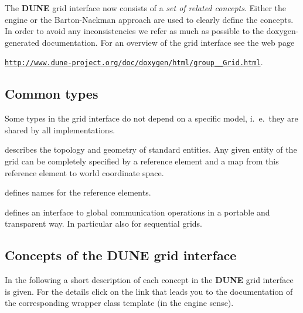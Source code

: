 \documentclass[11pt,a4paper,headinclude,footinclude,DIV16,normalheadings]{scrreprt}
\newcommand{\Dune}{{\sf\bfseries DUNE}}
\begin{document}
The \Dune{} grid interface now consists of a \textit{set of related concepts}.
Either the engine or the Barton-Nackman approach are used to clearly
define the concepts. In order to avoid any inconsistencies we refer as
much as possible to the doxygen-generated documentation. For an
overview of the grid interface see the web page 
\begin{center}
\href{http://www.dune-project.org/doc/doxygen/html/group__Grid.html}%
{\texttt{http://www.dune-project.org/doc/doxygen/html/group\_\_Grid.html}}.
\end{center}



\subsection{Common types}

Some types in the grid interface do not depend on a specific model,
i.~e.~they are shared by all implementations.


describes the topology and geometry of standard entities. Any given
entity of the grid can be completely specified by a reference element
and a map from this reference element to world coordinate space. 


defines names for the reference elements.


defines an interface to global communication operations in a portable
and transparent way. In particular also for sequential grids. 


\subsection{Concepts of the \texorpdfstring{\Dune{}}{DUNE} grid interface}

In the following a short description of each concept in the \Dune{}
grid interface is given. For the details click on the link that leads
you to the documentation of the corresponding wrapper class template 
(in the engine sense).

\end{document}

